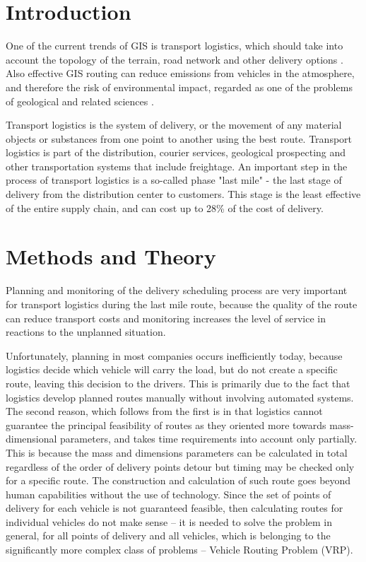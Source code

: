 \section*{Introduction}

One of the current trends of GIS is transport logistics, which should take into account the topology of the terrain, road network and other delivery options \cite{eng_Markelov_2015}. Also effective GIS routing can reduce emissions from vehicles in the atmosphere, and therefore the risk of environmental impact, regarded as one of the problems of geological and related sciences \cite{eng_Zhukov_2013}.

Transport logistics is the system of delivery, or the movement of any material objects or substances from one point to another using the best route. Transport logistics is part of the distribution, courier services, geological prospecting and other transportation systems that include freightage. An important step in the process of transport logistics is a so-called phase "last mile" - the last stage of delivery from the distribution center to customers. This stage is the least effective of the entire supply chain, and can cost up to 28\% of the cost of delivery. \cite{Scott_2009}

\section*{Methods and Theory}

Planning and monitoring of the delivery scheduling process are very important for transport logistics during the last mile route, because the quality of the route can reduce transport costs and monitoring increases the level of service in reactions to the unplanned situation.

Unfortunately, planning in most companies occurs inefficiently today, because logistics decide which vehicle will carry the load, but do not create a specific route, leaving this decision to the drivers. This is primarily due to the fact that logistics develop planned routes manually without involving automated systems. The second reason, which follows from the first is in that logistics cannot guarantee the principal feasibility of routes as they oriented more towards mass-dimensional parameters, and takes time requirements into account only partially. This is because the mass and dimensions parameters can be calculated in total regardless of the order of delivery points detour but timing may be checked only for a specific route. The construction and calculation of such route goes beyond human capabilities without the use of technology. Since the set of points of delivery for each vehicle is not guaranteed feasible, then calculating routes for individual vehicles do not make sense – it is needed to solve the problem in general, for all points of delivery and all vehicles, which is belonging to the significantly more complex class of problems – Vehicle Routing Problem (VRP).

